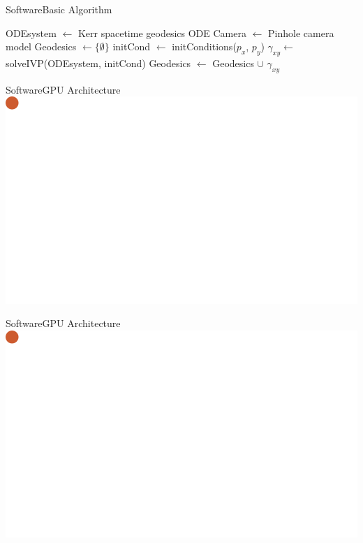 \begin{frame}{Software}{Basic Algorithm}
{
	\tiny
	\begin{algorithm}[H]
		\begin{algorithmic}[1]
			\State ODEsystem $\gets$ Kerr spacetime geodesics ODE
			\State Camera $\gets$ Pinhole camera model
			\State Geodesics $\gets \{\emptyset\}$
			\State initCond $\gets$ initConditions($p_x$, $p_y$)
			\State $\gamma_{xy} \gets$ solveIVP(ODEsystem, initCond)
			\State Geodesics $\gets$ Geodesics $\cup$ $\gamma_{xy}$
			\EndFor
			\EndFunction
		\end{algorithmic}
	\end{algorithm}
}
\end{frame}

\begin{frame}{Software}{GPU Architecture}
	\centering
	\includegraphics[width=0.6\paperwidth]{gfx/cores01}
\end{frame}

\begin{frame}{Software}{GPU Architecture}
\centering
\includegraphics[width=0.6\paperwidth]{gfx/cores02}
\end{frame}

